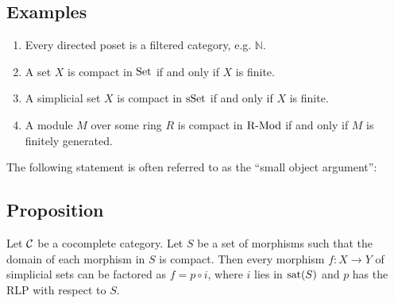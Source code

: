     \subsection{Examples}\label{chV-2-29}
        \begin{enumerate}[label=\roman*)]
            \item 
                Every directed poset is a filtered category, e.g. $\mathbb{N}$.
            \item 
                A set $X$ is compact in $\operatorname{Set}$ if and only if $X$ is finite.
            \item 
                A simplicial set $X$ is compact in $\operatorname{sSet}$ if and only if $X$ is finite.
            \item 
                A module $M$ over some ring $R$ is compact in $\operatorname{R-Mod}$ if and only if $M$ is finitely generated.
        \end{enumerate}

        The following statement is often referred to as the ``small object argument'':

    \subsection{Proposition}\label{chV-2-30}
        Let $\mathcal{C}$ be a cocomplete category. Let $S$ be a set of morphisms such that the domain of each morphism in $S$ is compact. Then every morphism $f \colon X \to Y$ of simplicial sets can be factored as $f = p \circ i$, where $i$ lies in $\operatorname{sat}(S)$ and $p$ has the RLP with respect to $S$.

